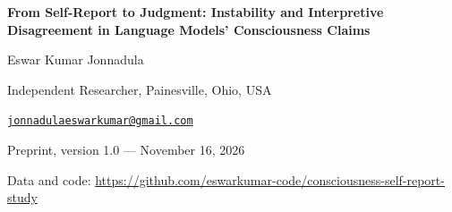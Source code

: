 \documentclass[11pt]{article}
\begin{document}
\begin{center}
{\LARGE\bfseries From Self-Report to Judgment: Instability and Interpretive Disagreement in Language Models' Consciousness Claims\par}
\vspace{1.2em}
{\large Eswar Kumar Jonnadula\par}
\vspace{0.3em}
Independent Researcher, Painesville, Ohio, USA\par
\href{mailto:jonnadulaeswarkumar@gmail.com}{\texttt{jonnadulaeswarkumar@gmail.com}}\par
\vspace{0.8em}
{\small Preprint, version 1.0 --- November 16, 2026\par
Data and code: \url{https://github.com/eswarkumar-code/consciousness-self-report-study}\par}
\end{center}
\vspace{0.5em}
\end{document}

